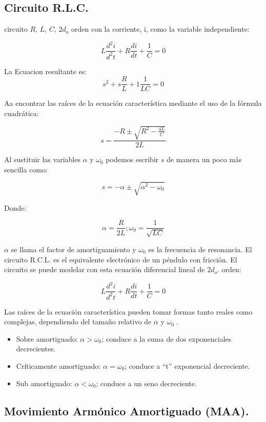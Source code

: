 \documentclass[11pt]{article}
\begin{document}
\begin{multicols}{2}
	\subsection{Circuito R.L.C.}

		circuito $R$, $L$, $C$, $2d_o$ orden con la corriente, i, como la variable independiente:

		$$L \frac{d^2i}{d^2t} + R\frac{di}{dt} + \frac{1}{C} = 0$$

		La Ecuacion resultante es: \\

		$$s^2 + s\frac{R}{L} + 1\frac{1}{LC} = 0$$

		Aa encontrar las raíces de la ecuación característica mediante el uso de la fórmula cuadrática:
		
		$$s = \frac{-R\pm \sqrt{R^2-\frac{4L}{C}} }{2L}$$

		Al sustituir las variables $\alpha$ y $\omega _0$ podemos escribir $s$ de manera un poco más sencilla como:

		$$s = - \alpha \pm \sqrt{\alpha^2 - \omega _0}$$

		Donde:

		$$\alpha = \frac{R}{2L} ; \omega _0 = \frac{1}{\sqrt{LC}}$$

		$\alpha$ se llama el factor de amortiguamiento y $\omega _0$ es la frecuencia de resonancia.
		El circuito R.C.L. es el equivalente electrónico de un péndulo con fricción. El circuito se puede modelar con esta ecuación diferencial lineal de $2d_o$. orden:

		$$L \frac{d^2i}{d^2t} + R\frac{di}{dt} + \frac{1}{C} = 0$$

		Las raíces de la ecuación característica pueden tomar formas tanto reales como complejas, dependiendo del tamaño relativo de $\alpha$ y $\omega _0$ .


		\begin{itemize}
			\item Sobre amortiguado: $\alpha > \omega _0$; conduce a la suma de dos exponenciales decrecientes.
			\item Críticamente amortiguado:  $\alpha = \omega _0$; conduce a “t” exponencial decreciente.
			\item Sub amortiguado:  $\alpha < \omega _0$; conduce a un seno decreciente.
		\end{itemize}

	\subsection{Movimiento Armónico Amortiguado (MAA).}


\end{multicols}
\end{document}
